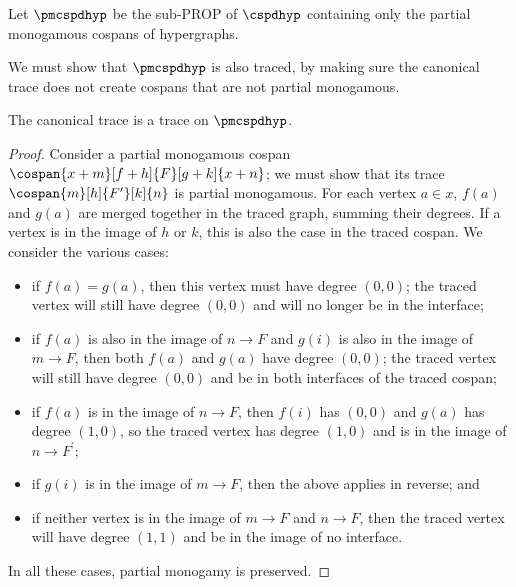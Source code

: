 \begin{definition}
    Let \(\pmcspdhyp\) be the sub-PROP of \(\cspdhyp\) containing only the
    partial monogamous cospans of hypergraphs.
\end{definition}

We must show that \(\pmcspdhyp\) is also traced, by making sure the canonical
trace does not create cospans that are not partial monogamous.

\begin{theorem}\label{thm:partial-monogamous-trace}
    The canonical trace is a trace on \(\pmcspdhyp\).
\end{theorem}
\begin{proof}
    Consider a partial monogamous cospan \(
    \cospan{x + m}[f + h]{F}[g + k]{x + n}
    \); we must show that its trace \(
    \cospan{m}[h]{F^\prime}[k]{n}
    \) is partial monogamous.
    For each vertex \(a \in x\), \(f(a)\) and \(g(a)\) are merged together in the
    traced graph, summing their degrees.
    If a vertex is in the image of \(h\) or \(k\), this is also the case in the
    traced cospan.
    We consider the various cases:
    \begin{itemize}
        \item if \(f(a) = g(a)\), then this vertex must have degree \((0, 0)\);
              the traced vertex will still have degree \((0, 0)\) and will no
              longer be in the interface;
        \item if \(f(a)\) is also in the image of \(n \to F\) and \(g(i)\) is
              also in the image of \(m \to F\), then both \(f(a)\) and
              \(g(a)\) have degree \((0, 0)\); the traced vertex will still
              have degree \((0, 0)\) and be in both interfaces of the traced
              cospan;
        \item if \(f(a)\) is in the image of \(n \to F\), then \(f(i)\)
              has \((0, 0)\) and \(g(a)\) has degree
              \((1,0)\), so the traced vertex has degree \((1, 0)\) and
              is in the image of \(n \to F^\prime\);
        \item if \(g(i)\) is in the image of \(m \to F\), then the above
              applies in reverse; and
        \item if neither vertex is in the image of \(m \to F\) and \(n \to F\),
              then the traced vertex will have degree \((1,1)\) and be in the
              image of no interface.
    \end{itemize}
    In all these cases, partial monogamy is preserved.
\end{proof}

